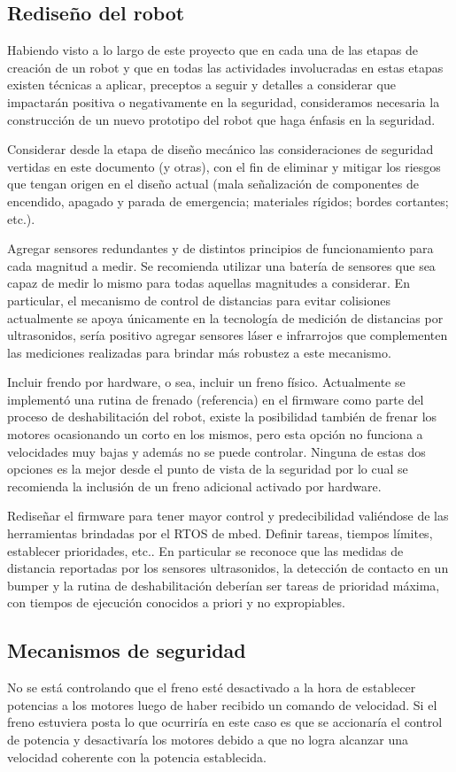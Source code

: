 \documentclass[withindex,glossary]{cam-thesis}
\begin{document}
\subsection{Rediseño del robot}
Habiendo visto a lo largo de este proyecto que en cada una de las etapas de creación de un robot y que en todas las actividades involucradas en estas etapas existen técnicas a aplicar, preceptos a seguir y detalles a considerar que impactarán positiva o negativamente en la seguridad, consideramos necesaria la construcción de un nuevo prototipo del robot que haga énfasis en la seguridad.

Considerar desde la etapa de diseño mecánico las consideraciones de seguridad vertidas en este documento (y otras), con el fin de eliminar y mitigar los riesgos que tengan origen en el diseño actual (mala señalización de componentes de encendido, apagado y parada de emergencia; materiales rígidos; bordes cortantes; etc.).

Agregar sensores redundantes y de distintos principios de funcionamiento para cada magnitud a medir. Se recomienda utilizar una batería de sensores que sea capaz de medir lo mismo para todas aquellas magnitudes a considerar. En particular, el mecanismo de control de distancias para evitar colisiones actualmente se apoya únicamente en la tecnología de medición de distancias por ultrasonidos, sería positivo agregar sensores láser e infrarrojos que complementen las mediciones realizadas para brindar más robustez a este mecanismo.

Incluir frendo por hardware, o sea, incluir un freno físico. Actualmente se implementó una rutina de frenado (referencia) en el firmware como parte del proceso de deshabilitación del robot, existe la posibilidad también de frenar los motores ocasionando un corto en los mismos, pero esta opción no funciona a velocidades muy bajas y además no se puede controlar. Ninguna de estas dos opciones es la mejor desde el punto de vista de la seguridad por lo cual se recomienda la inclusión de un freno adicional activado por hardware.

Rediseñar el firmware para tener mayor control y predecibilidad valiéndose de las herramientas brindadas por el RTOS de mbed. Definir tareas, tiempos límites, establecer prioridades, etc.. En particular se reconoce que las medidas de distancia reportadas por los sensores ultrasonidos, la detección de contacto en un bumper y la rutina de deshabilitación deberían ser tareas de prioridad máxima, con tiempos de ejecución conocidos a priori y no expropiables.
\subsection{Mecanismos de seguridad}
No se está controlando que el freno esté desactivado a la hora de establecer potencias a los motores luego de haber recibido un comando de velocidad. Si el freno estuviera posta lo que ocurriría en este caso es que se accionaría el control de potencia y desactivaría los motores debido a que no logra alcanzar una velocidad coherente con la potencia establecida.
\end{document}
